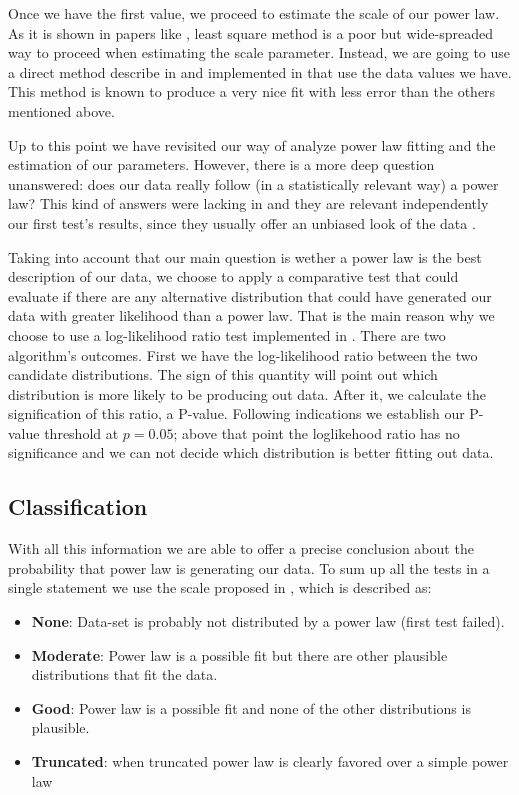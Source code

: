\documentclass{article}
\begin{document}
Once we have the first value, we proceed to estimate the scale of our
power law.  As it is shown in papers like \cite{newman2005power,
  clauset2009power}, least square method is a poor but wide-spreaded
way to proceed when estimating the scale parameter. Instead, we are
going to use a direct method describe in \cite{clauset2009power} and
implemented in \cite{alstott2014powerlaw} that use the data values we
have. This method is known to produce a very nice fit with less error
than the others mentioned above.

Up to this point we have revisited our way of analyze power law
fitting and the estimation of our parameters. However, there is a more
deep question unanswered: does our data really follow (in a
statistically relevant way) a power law?  This kind of answers were
lacking in \cite{merelo2017self} and they are relevant independently
our first test's results, since they usually offer an unbiased look of
the data .

Taking into account that our main question is wether a power law is
the best description of our data, we choose to apply a comparative
test that could evaluate if there are any alternative distribution
that could have generated our data with greater likelihood than a
power law. That is the main reason why we choose to use a
log-likelihood ratio test implemented in \cite{alstott2014powerlaw}.
There are two algorithm's outcomes. First we have the log-likelihood
ratio between the two candidate distributions. The sign of this
quantity will point out which distribution is more likely to be
producing out data. After it, we calculate the signification of this
ratio, a P-value. Following \cite{alstott2014powerlaw} indications we
establish our P-value threshold at $p=0.05$; above that point the
loglikehood ratio has no significance and we can not decide which
distribution is better fitting out data.

\subsection{Classification}

With all this information we are able to offer a precise conclusion
about the probability that power law is generating our data. To sum up
all the tests in a single statement we use the scale proposed in
\cite{clauset2009power}, which is described as:
\begin{itemize}
\item \textbf{None}: Data-set is probably not distributed by a power
  law (first test failed).
\item \textbf{Moderate}: Power law is a possible fit but there are
  other plausible distributions that fit the data.
\item \textbf{Good}: Power law is a possible fit and none of the other
  distributions is plausible.
\item \textbf{Truncated}: when truncated power law is clearly favored
  over a simple power law
\end{itemize}
\end{document}
